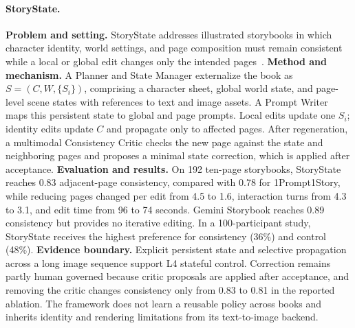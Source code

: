 \paragraph{StoryState.}
\textbf{Problem and setting.} StoryState addresses illustrated storybooks in which character identity, world settings, and page composition must remain consistent while a local or global edit changes only the intended pages~\cite{sarkar2026storystate}. \textbf{Method and mechanism.} A Planner and State Manager externalize the book as $S=(C,W,\{S_i\})$, comprising a character sheet, global world state, and page-level scene states with references to text and image assets. A Prompt Writer maps this persistent state to global and page prompts. Local edits update one $S_i$; identity edits update $C$ and propagate only to affected pages. After regeneration, a multimodal Consistency Critic checks the new page against the state and neighboring pages and proposes a minimal state correction, which is applied after acceptance. \textbf{Evaluation and results.} On 192 ten-page storybooks, StoryState reaches 0.83 adjacent-page consistency, compared with 0.78 for 1Prompt1Story, while reducing pages changed per edit from 4.5 to 1.6, interaction turns from 4.3 to 3.1, and edit time from 96 to 74 seconds. Gemini Storybook reaches 0.89 consistency but provides no iterative editing. In a 100-participant study, StoryState receives the highest preference for consistency (36\%) and control (48\%). \textbf{Evidence boundary.} Explicit persistent state and selective propagation across a long image sequence support L4 stateful control. Correction remains partly human governed because critic proposals are applied after acceptance, and removing the critic changes consistency only from 0.83 to 0.81 in the reported ablation. The framework does not learn a reusable policy across books and inherits identity and rendering limitations from its text-to-image backend.

